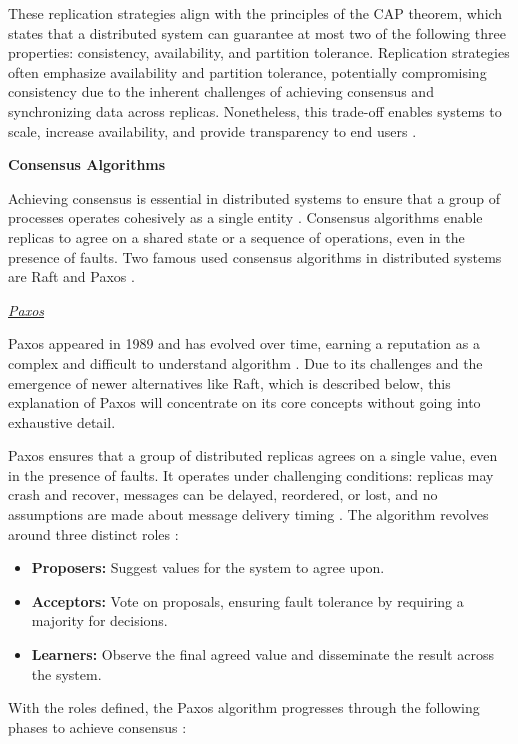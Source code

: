 These replication strategies align with the principles of the CAP theorem, which states that a distributed system can guarantee at most two of the following three properties: consistency, availability, and partition tolerance. Replication strategies often emphasize availability and partition tolerance, potentially compromising consistency due to the inherent challenges of achieving consensus and synchronizing data across replicas. Nonetheless, this trade-off enables systems to scale, increase availability, and provide transparency to end users \cite{Kleppmann2017}.

\textbf{Consensus Algorithms}

Achieving consensus is essential in distributed systems to ensure that a group of processes operates cohesively as a single entity \cite{Tanenbaum2023}. Consensus algorithms enable replicas to agree on a shared state or a sequence of operations, even in the presence of faults. Two famous used consensus algorithms in distributed systems are Raft and Paxos \cite{Tanenbaum2023}.

\textit{\underline{Paxos}}

Paxos appeared in 1989 and has evolved over time, earning a reputation as a complex and difficult to understand algorithm \cite{Tanenbaum2023}. Due to its challenges and the emergence of newer alternatives like Raft, which is described below, this explanation of Paxos will concentrate on its core concepts without going into exhaustive detail.

Paxos ensures that a group of distributed replicas agrees on a single value, even in the presence of faults. It operates under challenging conditions: replicas may crash and recover, messages can be delayed, reordered, or lost, and no assumptions are made about message delivery timing \cite{Howard2020, Tanenbaum2023}. The algorithm revolves around three distinct roles \cite{Coulouris2012, Howard2020}:

\begin{itemize}
    \item \textbf{Proposers:} Suggest values for the system to agree upon.
    \item \textbf{Acceptors:} Vote on proposals, ensuring fault tolerance by requiring a majority for decisions.
    \item \textbf{Learners:} Observe the final agreed value and disseminate the result across the system.
\end{itemize}

With the roles defined, the Paxos algorithm progresses through the following phases to achieve consensus \cite{Tanenbaum2023, Coulouris2012, Howard2020}:


